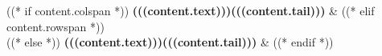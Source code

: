 ((* if content.colspan *))
 \textbf{(((content.text)))(((content.tail)))} &
((* elif content.rowspan *))
\\
((* else *))
\textbf{(((content.text)))(((content.tail)))} &
((* endif *))
